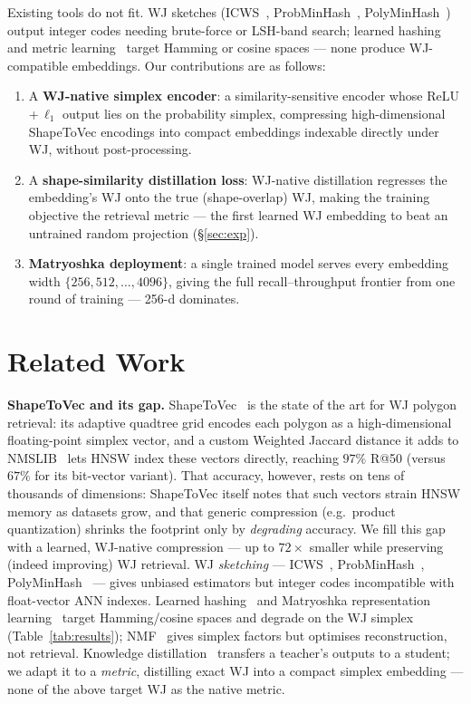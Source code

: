 \documentclass[sigconf]{acmart}
\begin{document}
Existing tools do not fit. WJ sketches (ICWS~\cite{ioffe10},
ProbMinHash~\cite{probminhash20}, PolyMinHash~\cite{polyminhash25}) output integer
codes needing brute-force or LSH-band search; learned hashing and metric
learning~\cite{hashsurvey14,deephashsurvey22} target Hamming or cosine spaces ---
none produce WJ-compatible embeddings. Our contributions are as follows:
\begin{enumerate}[leftmargin=1.2em,itemsep=1pt,topsep=1pt]
  \item A \textbf{WJ-native simplex encoder}: a similarity-sensitive encoder whose
    ReLU\,+\,$\ell_1$ output lies on the probability simplex, compressing
    high-dimensional ShapeToVec encodings into compact embeddings indexable directly
    under WJ, without post-processing.
  \item A \textbf{shape-similarity distillation loss}: WJ-native distillation
    regresses the embedding's WJ onto the true (shape-overlap) WJ, making the training
    objective the retrieval metric --- the first learned WJ embedding to beat an
    untrained random projection (\S\ref{sec:exp}).
  \item \textbf{Matryoshka deployment}: a single trained model serves every
    embedding width $\{256, 512, \dots,4096\}$, giving the full recall--throughput frontier from one round of training --- 256-d dominates.
\end{enumerate}

\section{Related Work}
\label{sec:related}
\textbf{ShapeToVec and its gap.} ShapeToVec~\cite{shape2vec} is the state of the art
for WJ polygon retrieval: its adaptive quadtree grid encodes each polygon as a
high-dimensional floating-point simplex vector, and a custom Weighted Jaccard
distance it adds to NMSLIB~\cite{boytsov13} lets HNSW index these vectors directly,
reaching $97\%$ R@50 (versus $67\%$ for its bit-vector variant). That accuracy,
however, rests on tens of thousands of dimensions: ShapeToVec itself notes that such
vectors strain HNSW memory as datasets grow, and that generic compression
(e.g.\ product quantization) shrinks the footprint only by \emph{degrading} accuracy.
We fill this gap with a learned, WJ-native compression --- up to $72\times$ smaller
while preserving (indeed improving) WJ retrieval.
WJ \emph{sketching} --- ICWS~\cite{ioffe10}, ProbMinHash~\cite{probminhash20},
PolyMinHash~\cite{polyminhash25} --- gives unbiased estimators but integer codes
incompatible with float-vector ANN indexes. Learned
hashing~\cite{hashsurvey14,deephashsurvey22} and Matryoshka representation
learning~\cite{matryoshka22} target Hamming/cosine spaces and degrade on the WJ
simplex (Table~\ref{tab:results}); NMF~\cite{nmf99} gives simplex factors but
optimises reconstruction, not retrieval. Knowledge distillation~\cite{hinton15}
transfers a teacher's outputs to a student; we adapt it to a \emph{metric},
distilling exact WJ into a compact simplex embedding --- none of the above target
WJ as the native metric.
\end{document}
